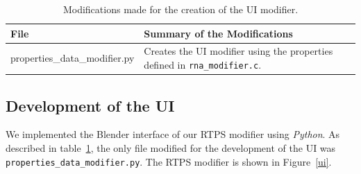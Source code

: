 \begin{table}[htdp]
\caption{Modifications made for the creation of the UI modifier.}
\begin{center}
\begin{tabular}{|p{6cm}|p{6cm}|}
\hline 
\textbf{File} & \textbf{Summary of the Modifications} \\\hline 
properties\_data\_modifier.py & Creates the UI modifier using the properties defined in \texttt{rna\_modifier.c}. \\
\hline 
\end{tabular}
\end{center}
\label{uiTable}
\end{table}

\subsection{Development of the UI}
We implemented the Blender interface of our RTPS modifier using \textit{Python}. As described in table~\ref{uiTable}, the only file modified for the development of the UI was \texttt{properties\_data\_modifier.py}. The RTPS modifier is shown in Figure~\ref{ui}.

